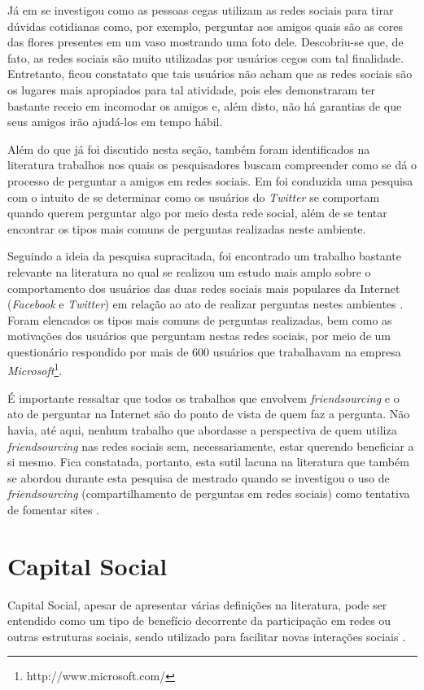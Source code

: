 Já em \cite{Brady:2013:IAS:2441776.2441915} se investigou como as pessoas cegas utilizam as redes sociais para tirar dúvidas cotidianas como, por exemplo, perguntar aos amigos quais são as cores das flores presentes em um vaso mostrando uma foto dele. Descobriu-se que, de fato, as redes sociais são muito utilizadas por usuários cegos com tal finalidade. Entretanto, ficou constatato que tais usuários não acham que as redes sociais são os lugares mais apropiados para tal atividade, pois eles demonstraram ter bastante receio em incomodar os amigos e, além disto, não há garantias de que seus amigos irão ajudá-los em tempo hábil.

Além do que já foi discutido nesta seção, também foram identificados na literatura trabalhos nos quais os pesquisadores buscam compreender como se dá o processo de perguntar a amigos em redes sociais. Em \cite{paul2011question} foi conduzida uma pesquisa com o intuito de se determinar como os usuários do \textit{Twitter} se comportam quando querem perguntar algo por meio desta rede social, além de se tentar encontrar os tipos mais comuns de perguntas realizadas neste ambiente.

Seguindo a ideia da pesquisa supracitada, foi encontrado um trabalho bastante relevante na literatura no qual se realizou um estudo mais amplo sobre o comportamento dos usuários das duas redes sociais mais populares da Internet (\textit{Facebook} e \textit{Twitter}) em relação ao ato de realizar perguntas nestes ambientes \cite{morris2010people}. Foram elencados os tipos mais comuns de perguntas realizadas, bem como as motivações dos usuários que perguntam nestas redes sociais, por meio de um questionário respondido por mais de 600 usuários que trabalhavam na empresa \textit{Microsoft}\footnote{http://www.microsoft.com/}.

É importante ressaltar que todos os trabalhos que envolvem \textit{friendsourcing} e o ato de perguntar na Internet são do ponto de vista de quem faz a pergunta. Não havia, até aqui, nenhum trabalho que abordasse a perspectiva de quem utiliza \textit{friendsourcing} nas redes sociais sem, necessariamente, estar querendo beneficiar a si mesmo. Fica constatada, portanto, esta sutil lacuna na literatura que também se abordou durante esta pesquisa de mestrado quando se investigou o uso de \textit{friendsourcing} (compartilhamento de perguntas em redes sociais) como tentativa de fomentar sites \qanospace.

\section{Capital Social}
Capital Social, apesar de apresentar várias definições na literatura, pode ser entendido como um tipo de benefício decorrente da participação em redes ou outras estruturas sociais, sendo utilizado para facilitar novas interações sociais \cite{portes2000social}.

